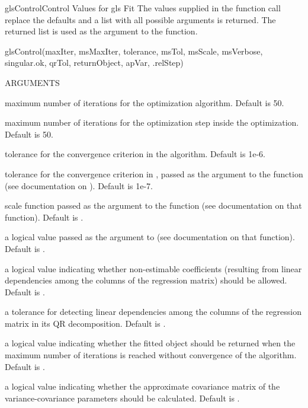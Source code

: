 \documentclass[pdftex]{article} \usepackage{url,graphicx}
\begin{document}
\begin{Helpfile}{glsControl}{Control Values for gls Fit}
The values supplied in the function call replace the defaults and a
list with all possible arguments is returned. The returned list is
used as the  argument to the  function.
\begin{Example}
glsControl(maxIter, msMaxIter, tolerance, msTol, msScale, 
           msVerbose, singular.ok, qrTol, returnObject, 
           apVar, .relStep) 
\end{Example}
\begin{Argument}{ARGUMENTS}
\item[\Co{maxIter:}]
maximum number of iterations for the 
optimization algorithm. Default is 50.
\item[\Co{msMaxIter:}]
maximum number of iterations
for the  optimization step inside the 
optimization. Default is 50.
\item[\Co{tolerance:}]
tolerance for the convergence criterion in the
 algorithm. Default is 1e-6.
\item[\Co{msTol:}]
tolerance for the convergence criterion in ,
passed as the  argument to the function (see
documentation on ). Default is 1e-7.
\item[\Co{msScale:}]
scale function passed as the  argument to
the  function (see documentation on that function). Default
is .
\item[\Co{msVerbose:}]
a logical value passed as the  argument to
 (see documentation on that function). Default is
.
\item[\Co{singular.ok:}]
a logical value indicating whether non-estimable
coefficients (resulting from linear dependencies among the columns of
the regression matrix) should be allowed. Default is .
\item[\Co{qrTol:}]
a tolerance for detecting linear dependencies among the
columns of the regression matrix in its QR decomposition. Default is
.
\item[\Co{returnObject:}]
a logical value indicating whether the fitted
object should be returned when the maximum number of iterations is
reached without convergence of the algorithm. Default is
.
\item[\Co{apVar:}]
a logical value indicating whether the approximate
covariance matrix of the variance-covariance parameters should be
calculated. Default is .

\end{Argument}
\end{Helpfile}
\end{document}
